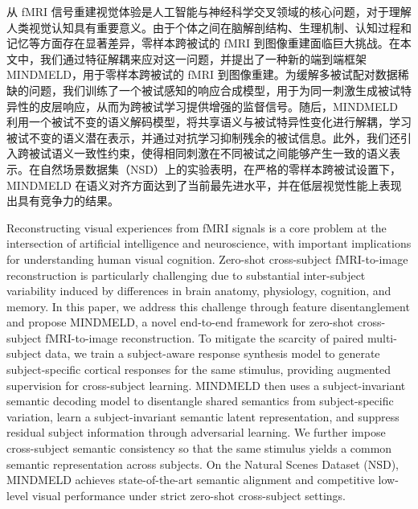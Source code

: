 \begin{cabstract}
从 fMRI 信号重建视觉体验是人工智能与神经科学交叉领域的核心问题，对于理解人类视觉认知具有重要意义。由于个体之间在脑解剖结构、生理机制、认知过程和记忆等方面存在显著差异，零样本跨被试的 fMRI 到图像重建面临巨大挑战。在本文中，我们通过特征解耦来应对这一问题，并提出了一种新的端到端框架 MINDMELD，用于零样本跨被试的 fMRI 到图像重建。为缓解多被试配对数据稀缺的问题，我们训练了一个被试感知的响应合成模型，用于为同一刺激生成被试特异性的皮层响应，从而为跨被试学习提供增强的监督信号。随后，MINDMELD 利用一个被试不变的语义解码模型，将共享语义与被试特异性变化进行解耦，学习被试不变的语义潜在表示，并通过对抗学习抑制残余的被试信息。此外，我们还引入跨被试语义一致性约束，使得相同刺激在不同被试之间能够产生一致的语义表示。在自然场景数据集（NSD）上的实验表明，在严格的零样本跨被试设置下，MINDMELD 在语义对齐方面达到了当前最先进水平，并在低层视觉性能上表现出具有竞争力的结果。
\end{cabstract}

\begin{eabstract}
Reconstructing visual experiences from fMRI signals is a core problem at the intersection of artificial intelligence and neuroscience, with important implications for understanding human visual cognition. Zero-shot cross-subject fMRI-to-image reconstruction is particularly challenging due to substantial inter-subject variability induced by differences in brain anatomy, physiology, cognition, and memory. In this paper, we address this challenge through feature disentanglement and propose MINDMELD, a novel end-to-end framework for zero-shot cross-subject fMRI-to-image reconstruction. To mitigate the scarcity of paired multi-subject data, we train a subject-aware response synthesis model to generate subject-specific cortical responses for the same stimulus, providing augmented supervision for cross-subject learning. MINDMELD then uses a subject-invariant semantic decoding model to disentangle shared semantics from subject-specific variation, learn a subject-invariant semantic latent representation, and suppress residual subject information through adversarial learning. We further impose cross-subject semantic consistency so that the same stimulus yields a common semantic representation across subjects. On the Natural Scenes Dataset (NSD), MINDMELD achieves state-of-the-art semantic alignment and competitive low-level visual performance under strict zero-shot cross-subject settings.
\end{eabstract}